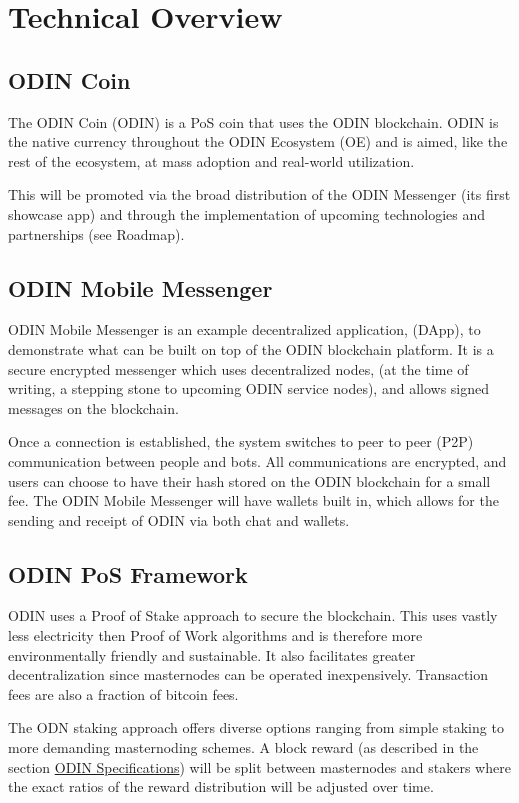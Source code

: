 \section{​Technical Overview}

\subsection{ODIN Coin}
The ODIN Coin (ODIN) is a PoS coin that uses the ODIN blockchain. ODIN is the native currency throughout the ODIN Ecosystem (OE) and is aimed, like the rest of the ecosystem, at mass adoption and real-world utilization. 
 
This will be promoted via the broad distribution of the ODIN Messenger (its first showcase app) and through the implementation of upcoming technologies and partnerships (see Roadmap).

\subsection{ODIN Mobile Messenger}
ODIN Mobile Messenger is an example decentralized application, (DApp), to demonstrate what can be built on top of the ODIN blockchain platform. It is a secure encrypted messenger which uses decentralized nodes, (at the time of writing, a stepping stone to upcoming ODIN service nodes), and allows signed messages on the blockchain. 
 
Once a connection is established, the system switches to peer to peer (P2P) communication between people and bots. All communications are encrypted, and users can choose to have their hash stored on the ODIN blockchain for a small fee. The ODIN  Mobile Messenger will have wallets built in, which allows for the sending and receipt of ODIN via both chat and wallets. 

\subsection{ODIN PoS Framework}
ODIN uses a Proof of Stake approach to secure the blockchain. This uses vastly less electricity then Proof of Work algorithms and is therefore more environmentally friendly and sustainable. It also facilitates greater decentralization since masternodes can be operated inexpensively. Transaction fees are also a fraction of bitcoin fees.

The ODN staking approach offers diverse options ranging from simple staking to more demanding masternoding schemes. A block reward (as described in the section \hyperlink{specifications}{ODIN Specifications}) will be split between masternodes and stakers where the exact ratios of the reward distribution will be adjusted over time.

